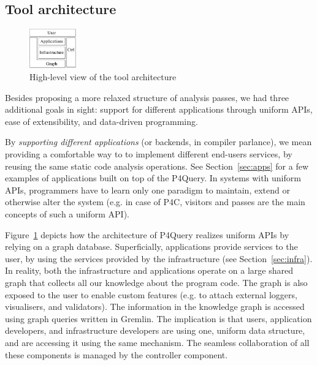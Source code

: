 \documentclass[sigconf]{acmart}
\begin{document}
\subsection{Tool architecture}\label{sec:rep} %


  \begin{figure}
    \includegraphics[width=0.18\textwidth]{figures/arch-top.pdf}
    \caption{High-level view of the tool architecture}\label{fig:arch-top}
  \end{figure}

Besides proposing a more relaxed structure of analysis passes, we had three additional goals in sight: support for different applications through uniform APIs, ease of extensibility, and data-driven programming.

By \textit{supporting different applications} (or backends, in compiler parlance), we mean providing a comfortable way to to implement different end-users services, by reusing the same static code analysis operations.
See Section~\ref{sec:apps} for a few examples of applications built on top of the P4Query.
In systems with uniform APIs, programmers have to learn only one paradigm to maintain, extend or otherwise alter the system (e.g. in case of P4C, visitors and passes are the main concepts of such a uniform API). 

Figure~\ref{fig:arch-top} depicts how the architecture of P4Query realizes uniform APIs by relying on a graph database. 
Superficially, applications provide services to the user, by using the services provided by the infrastructure (see Section~\ref{sec:infra}). In reality, both the infrastructure and applications operate on a large shared graph that collects all our knowledge about the program code. The graph is also exposed to the user to enable custom features (e.g. to attach external loggers, visualisers, and validators). The information in the knowledge graph is accessed using graph queries written in Gremlin. The implication is that users, application developers, and infrastructure developers are using one, uniform data structure, and are accessing it using the same mechanism. The seamless collaboration of all these components is managed by the controller component.
\end{document}
